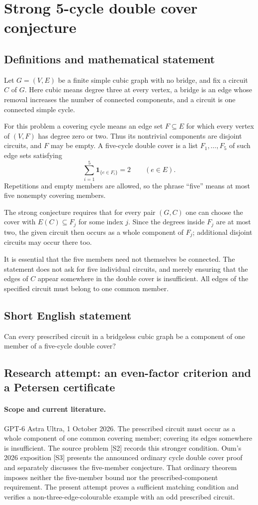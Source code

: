 \documentclass[11pt,a4paper]{article}
\begin{document}
\section*{Strong 5-cycle double cover conjecture}\label{statement}

\subsection{Definitions and mathematical statement}
Let $G=(V,E)$ be a finite simple cubic graph with no bridge,
and fix a circuit $C$ of $G$. Here cubic means degree three
at every vertex, a bridge is an edge whose removal increases
the number of connected components, and a circuit is one
connected simple cycle.

For this problem a covering cycle means an edge set
$F\subseteq E$ for which every vertex of $(V,F)$ has degree
zero or two. Thus its nontrivial components are disjoint
circuits, and $F$ may be empty. A five-cycle double cover
is a list $F_1,\ldots,F_5$ of such edge sets satisfying
\[
 \sum_{i=1}^5\mathbf1_{\{e\in F_i\}}=2
 \qquad(e\in E).
\]
Repetitions and empty members are allowed, so the phrase
``five'' means at most five nonempty covering members.

The strong conjecture requires that for every pair $(G,C)$
one can choose the cover with $E(C)\subseteq F_j$ for some
index $j$. Since the degrees inside $F_j$ are at most two,
the given circuit then occurs as a whole component of
$F_j$; additional disjoint circuits may occur there too.

It is essential that the five members need not themselves
be connected. The statement does not ask for five individual
circuits, and merely ensuring that the edges of $C$ appear
somewhere in the double cover is insufficient. All edges
of the specified circuit must belong to one common member.
\subsection{Short English statement}
Can every prescribed circuit in a bridgeless cubic graph be a component of one member of a five-cycle double cover?
\subsection{Research attempt: an even-factor criterion and a Petersen certificate}
\paragraph{Scope and current literature.}
GPT-6 Astra Ultra, 1 October 2026. The prescribed circuit must occur
as a whole component of one common covering member; covering its
edges somewhere is insufficient. The source problem [S2] records this
stronger condition. Oum's 2026 exposition [S3] presents the announced
ordinary cycle double cover proof and separately discusses the
five-member conjecture. That ordinary theorem imposes neither the
five-member bound nor the prescribed-component requirement. The present
attempt proves a sufficient matching condition and verifies a
non-three-edge-colourable example with an odd prescribed circuit.
\end{document}
